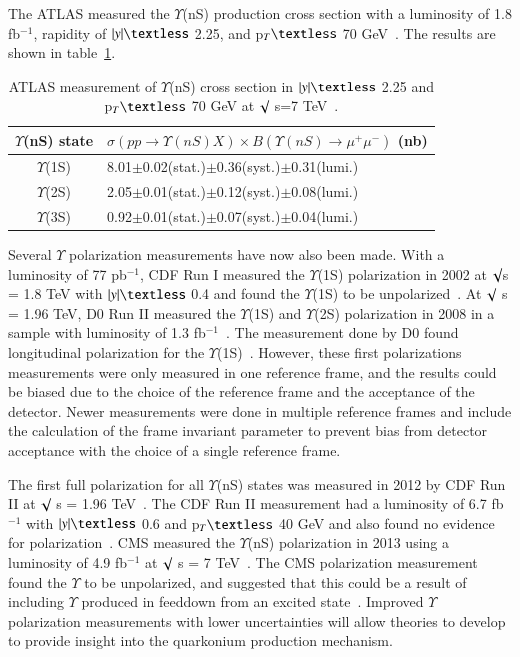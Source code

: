 The ATLAS measured the $\Upsilon$(nS) production cross section
with a luminosity of 1.8 fb$^{-1}$, rapidity of $|y|\textless$ 2.25,
and p$_{T}\textless$ 70 GeV~\cite{ATLAS:2012lmu}. The results are shown
in table~\ref{Tab:ATLASYCross}.


\begin{table}
  \begin{center}
    \caption[]{ATLAS measurement of $\Upsilon$(nS) cross section in $|y|\textless$ 2.25 and p$_{T}\textless$ 70 GeV
      at $\surd$ s=7 TeV~\cite{ATLAS:2012lmu}.}
\label{Tab:ATLASYCross}
\begin{tabular}{cl} 
\hline 
\hline
$\Upsilon$(nS) state             &$ \sigma(pp \rightarrow \Upsilon(nS)X) \times B(\Upsilon(nS)\rightarrow\mu^{+}\mu^{-})$ (nb)    \\              
\hline
$\Upsilon$(1S)                   &8.01$\pm$0.02(stat.)$\pm$0.36(syst.)$\pm$0.31(lumi.)\\
$\Upsilon$(2S)                   &2.05$\pm$0.01(stat.)$\pm$0.12(syst.)$\pm$0.08(lumi.)\\
$\Upsilon$(3S)                   &0.92$\pm$0.01(stat.)$\pm$0.07(syst.)$\pm$0.04(lumi.)\\
\hline
\hline
\end{tabular}
\end{center}
\end{table}

Several $\Upsilon$ polarization measurements have now also been made. With a luminosity
of 77 pb$^{-1}$, CDF Run I measured the $\Upsilon$(1S) polarization in 2002 at $\surd$s =
1.8 TeV with $|y|\textless$ 0.4 and found the $\Upsilon$(1S) to be unpolarized~\cite{CDF:2001fdy}.
At $\surd$ s = 1.96 TeV, D0 Run II measured the $\Upsilon$(1S) and $\Upsilon$(2S) polarization in
2008 in a sample with luminosity of 1.3 fb$^{-1}$~\cite{D0:2008yos}. The measurement done by D0 found
longitudinal polarization for the $\Upsilon$(1S)~\cite{D0:2008yos}. However, these first polarizations
measurements were only measured in one reference frame, and the results could be biased due to the choice
of the reference frame and the acceptance of the detector. Newer measurements were done in multiple
reference frames and include the calculation of the frame invariant parameter to
prevent bias from detector acceptance with the choice of a single reference frame.


The first full polarization for all $\Upsilon$(nS) states was measured in 2012 by CDF Run
II at $\surd$ s = 1.96 TeV~\cite{CDF:2011ag}. The CDF Run II measurement had a luminosity of 6.7 fb$^{-1}$
with $|y|\textless$ 0.6 and p$_{T}\textless$ 40 GeV and also found no evidence for
polarization~\cite{CDF:2011ag}. CMS measured the $\Upsilon$(nS) polarization in 2013 using a luminosity
of 4.9 fb$^{-1}$ at $\surd$ s = 7 TeV~\cite{CMS:2012bpf}. The CMS polarization measurement found the $\Upsilon$
to be unpolarized, and suggested that this could be a result of including $\Upsilon$ produced
in feeddown from an excited state~\cite{CMS:2012bpf}. Improved $\Upsilon$ polarization measurements with lower
uncertainties will allow theories to develop to provide insight into the quarkonium production
mechanism.




